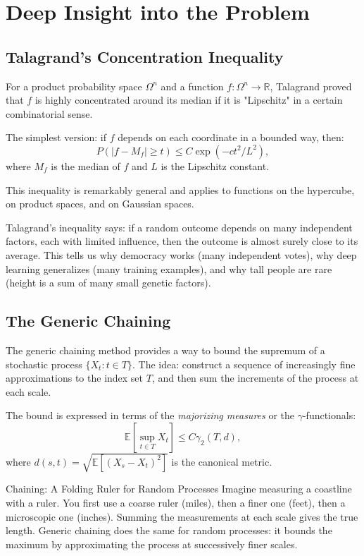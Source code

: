 \section{Deep Insight into the Problem}

\subsection{Talagrand's Concentration Inequality}

For a product probability space $\Omega^n$ and a function $f: \Omega^n \to \mathbb{R}$, Talagrand proved that $f$ is highly concentrated around its median if it is "Lipschitz" in a certain combinatorial sense.

The simplest version: if $f$ depends on each coordinate in a bounded way, then:
\[
P(|f - M_f| \geq t) \leq C \exp(-c t^2 / L^2),
\]
where $M_f$ is the median of $f$ and $L$ is the Lipschitz constant.

This inequality is remarkably general and applies to functions on the hypercube, on product spaces, and on Gaussian spaces.

\begin{bigidea}
Talagrand's inequality says: if a random outcome depends on many independent factors, each with limited influence, then the outcome is almost surely close to its average. This tells us why democracy works (many independent votes), why deep learning generalizes (many training examples), and why tall people are rare (height is a sum of many small genetic factors).
\end{bigidea}

\subsection{The Generic Chaining}

The generic chaining method provides a way to bound the supremum of a stochastic process $\{X_t : t \in T\}$. The idea: construct a sequence of increasingly fine approximations to the index set $T$, and then sum the increments of the process at each scale.

The bound is expressed in terms of the \emph{majorizing measures} or the $\gamma$-functionals:
\[
\mathbb{E}\left[\sup_{t \in T} X_t\right] \leq C \gamma_2(T, d),
\]
where $d(s,t) = \sqrt{\mathbb{E}[(X_s - X_t)^2]}$ is the canonical metric.

\begin{analogy}{Chaining: A Folding Ruler for Random Processes}
Imagine measuring a coastline with a ruler. You first use a coarse ruler (miles), then a finer one (feet), then a microscopic one (inches). Summing the measurements at each scale gives the true length. Generic chaining does the same for random processes: it bounds the maximum by approximating the process at successively finer scales.
\end{analogy}

